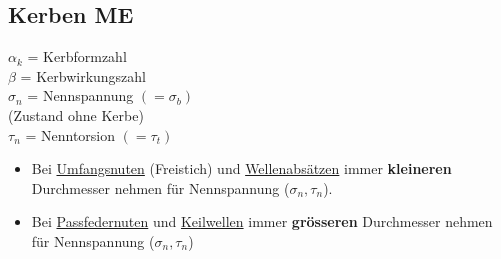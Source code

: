 \subsection{Kerben \hfill ME}
\begin{footnotesize}
    \begin{minipage}{0.58\linewidth}
        \begin{center}
        \end{center}
    \end{minipage}
    \begin{minipage}{0.4\linewidth}
        \begin{scriptsize}
            \begin{center}
                $\alpha_k$ = Kerbformzahl
                \\$\beta$ = Kerbwirkungszahl 
                \\$\sigma_n$ = Nennspannung $(= \sigma_b)$
                \\(Zustand ohne Kerbe)
                \\$\tau_n$ = Nenntorsion $(= \tau_t)$
            \end{center}
        \end{scriptsize}
    \end{minipage}
    \begin{itemize}
        \item \scriptsize Bei \underline{Umfangsnuten} (Freistich) und \underline{Wellenabsätzen} immer \textbf{kleineren} Durchmesser nehmen für Nennspannung ($\sigma_n, \tau_n$).
        \item \scriptsize Bei \underline{Passfedernuten} und \underline{Keilwellen} immer \textbf{grösseren} Durchmesser nehmen für Nennspannung ($\sigma_n, \tau_n$)
    \end{itemize}
\end{footnotesize}